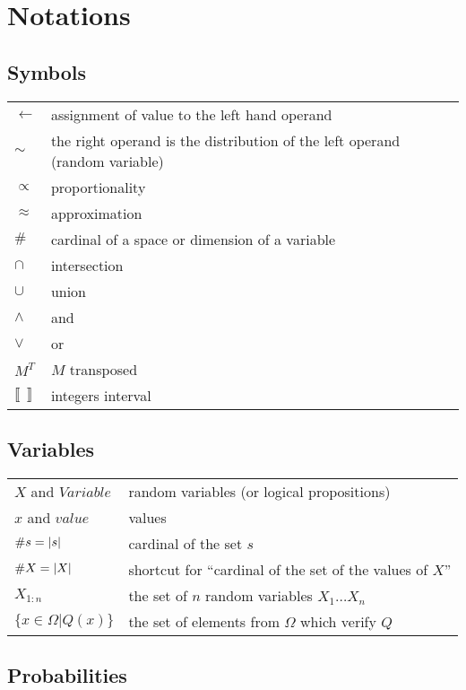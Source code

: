 \section*{Notations}

\subsection*{Symbols}
\begin{tabular}{ll}
$\leftarrow$ & assignment of value to the left hand operand \\
$\sim$ & the right operand is the distribution of the left operand (random variable) \\
$\propto$ & proportionality \\
$\approx$ & approximation \\
$\#$ & cardinal of a space or dimension of a variable \\
$\cap$ & intersection \\
$\cup$ & union \\
$\wedge$ & and \\
$\vee$ & or \\
$M^T$ & $M$ transposed \\
$\llbracket \ \ \rrbracket$ & integers interval \\
\end{tabular}

\subsection*{Variables}
\begin{tabular}{ll}
$X$ and $Variable$ & random variables (or logical propositions) \\
$x$ and $value$ & values \\
$\#s = \left\lvert s\right\rvert$ & cardinal of the set $s$ \\
$\#X = \left\lvert X\right\rvert$ & shortcut for ``cardinal of the set of the values of $X$'' \\
$X_{1:n}$ & the set of $n$ random variables $X_1 \dots X_n$ \\
$\{x \in \Omega | Q(x)\}$ & the set of elements from $\Omega$ which verify $Q$ \\
\end{tabular}

\subsection*{Probabilities}

